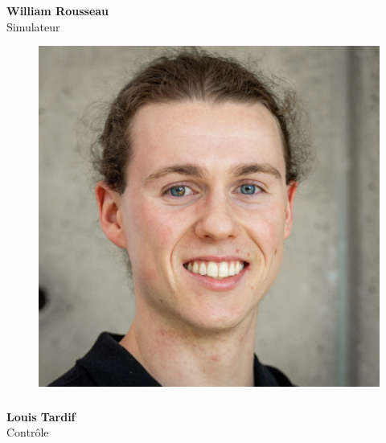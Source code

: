 \documentclass[a0paper,portrait]{baposter}
\begin{document}
\begin{poster}
{\subsubsection*{}
\vspace{2mm}
\textbf{William Rousseau}\\
Simulateur

\begin{figure}
\includegraphics[width=.9\linewidth]{img/membres/Louis-Tardif-3.jpg} 
\end{figure}
\subsubsection*{}
\vspace{2mm}
\textbf{Louis Tardif}\\
Contrôle
\vspace{1cm}
}




\end{poster}
\end{document}
